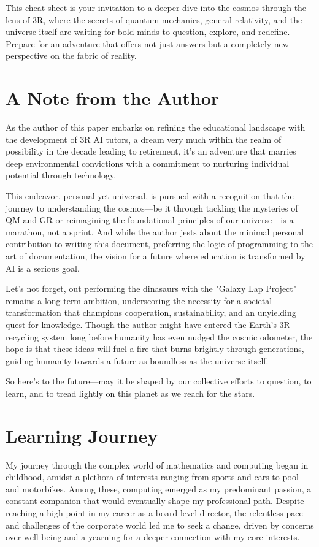\documentclass[12pt]{article}
\begin{document}
This cheat sheet is your invitation to a deeper dive into the cosmos through the lens of 3R, where the secrets of quantum mechanics, general relativity, and the universe itself are waiting for bold minds to question, explore, and redefine. Prepare for an adventure that offers not just answers but a completely new perspective on the fabric of reality.

\section*{A Note from the Author}

As the author of this paper embarks on refining the educational landscape with the development of 3R AI tutors, a dream very much within the realm of possibility in the decade leading to retirement, it's an adventure that marries deep environmental convictions with a commitment to nurturing individual potential through technology.

This endeavor, personal yet universal, is pursued with a recognition that the journey to understanding the cosmos—be it through tackling the mysteries of QM and GR or reimagining the foundational principles of our universe—is a marathon, not a sprint. And while the author jests about the minimal personal contribution to writing this document, preferring the logic of programming to the art of documentation, the vision for a future where education is transformed by AI is a serious goal.

Let's not forget, out performing the dinasaurs with the "Galaxy Lap Project" remains a long-term ambition, underscoring the necessity for a societal transformation that champions cooperation, sustainability, and an unyielding quest for knowledge. Though the author might have entered the Earth's 3R recycling system long before humanity has even nudged the cosmic odometer, the hope is that these ideas will fuel a fire that burns brightly through generations, guiding humanity towards a future as boundless as the universe itself.

So here's to the future—may it be shaped by our collective efforts to question, to learn, and to tread lightly on this planet as we reach for the stars.

\section*{Learning Journey}
My journey through the complex world of mathematics and computing began in childhood, amidst a plethora of interests ranging from sports and cars to pool and motorbikes. Among these, computing emerged as my predominant passion, a constant companion that would eventually shape my professional path. Despite reaching a high point in my career as a board-level director\cite{Ed2002DNA}, the relentless pace and challenges of the corporate world led me to seek a change, driven by concerns over well-being and a yearning for a deeper connection with my core interests.
\end{document}
